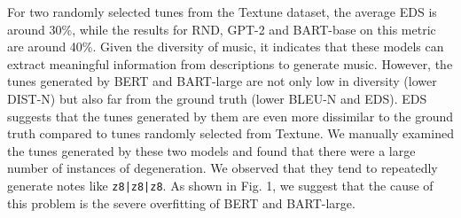 \documentclass[letterpaper]{article} %
\begin{document}
For two randomly selected tunes from the Textune dataset, the average EDS is around 30\%, while the results for RND, GPT-2 and BART-base on this metric are around 40\%. Given the diversity of music, it indicates that these models can extract meaningful information from descriptions to generate music. However, the tunes generated by BERT and BART-large are not only low in diversity (lower DIST-N) but also far from the ground truth (lower BLEU-N and EDS). EDS suggests that the tunes generated by them are even more dissimilar to the ground truth compared to tunes randomly selected from Textune. We manually examined the tunes generated by these two models and found that there were a large number of instances of degeneration. We observed that they tend to repeatedly generate notes like \texttt{z8|z8|z8}. As shown in Fig. 1, we suggest that the cause of this problem is the severe overfitting of BERT and BART-large.
\end{document}
